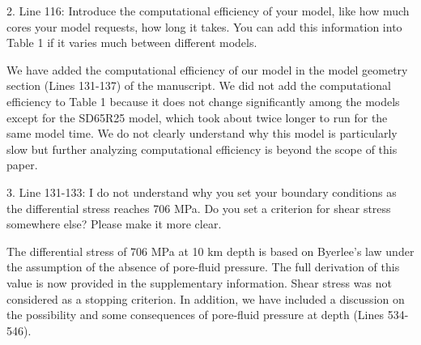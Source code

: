 \documentclass[12pt]{article}
\begin{document}
\begin{response}{2. Line 116: Introduce the computational efficiency of your model, like how much cores your model requests, how long it takes. You can add this information into Table 1 if it varies much between different models.}

  We have added the computational efficiency of our model in the model geometry section (Lines 131-137) of the manuscript. We did not add the computational efficiency to Table 1 because it does not change significantly among the models except for the SD65R25 model, which took about twice longer to run for the same model time. We do not clearly understand why this model is particularly slow but further analyzing computational efficiency is beyond the scope of this paper.
  
\end{response}


\begin{response}{3. Line 131-133: I do not understand why you set your boundary conditions as the differential stress reaches 706 MPa. Do you set a criterion for shear stress somewhere else? Please make it more clear.}

  The differential stress of 706 MPa at 10 km depth is based on Byerlee's law under the assumption of  
  the absence of pore-fluid pressure. The full derivation of this value is now provided in the supplementary information. Shear stress was not considered as a stopping criterion. In addition, we have included a discussion on the possibility and some consequences of pore-fluid pressure at depth (Lines 534-546).
  
\end{response}
\end{document}

